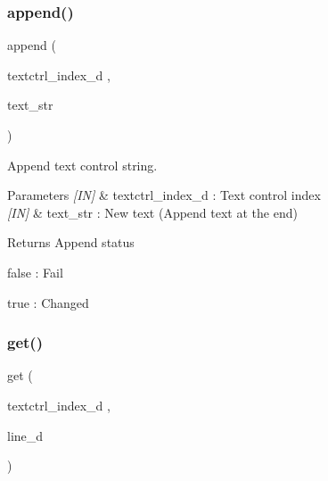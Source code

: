 \subsubsection{append()}
{\footnotesize\ttfamily append (\begin{DoxyParamCaption}\item[{textctrl\+\_\+index\+\_\+d}]{,  }\item[{text\+\_\+str}]{ }\end{DoxyParamCaption})}



Append text control string. 


\begin{DoxyCode}{0}
\end{DoxyCode}



\begin{DoxyParams}{Parameters}
{\em \mbox{[}\+I\+N\mbox{]}} & textctrl\+\_\+index\+\_\+d \+: Text control index \\
\hline
{\em \mbox{[}\+I\+N\mbox{]}} & text\+\_\+str \+: New text (Append text at the end) \\
\hline
\end{DoxyParams}
\begin{DoxyReturn}{Returns}
Append status \begin{DoxyItemize}
\item false \+: Fail \item true \+: Changed \end{DoxyItemize}

\end{DoxyReturn}
\mbox{\label{classtextctrl_ad86b7120566740f7457c61325441ab69}} 
\subsubsection{get()}
{\footnotesize\ttfamily get (\begin{DoxyParamCaption}\item[{textctrl\+\_\+index\+\_\+d}]{,  }\item[{line\+\_\+d}]{ }\end{DoxyParamCaption})}



